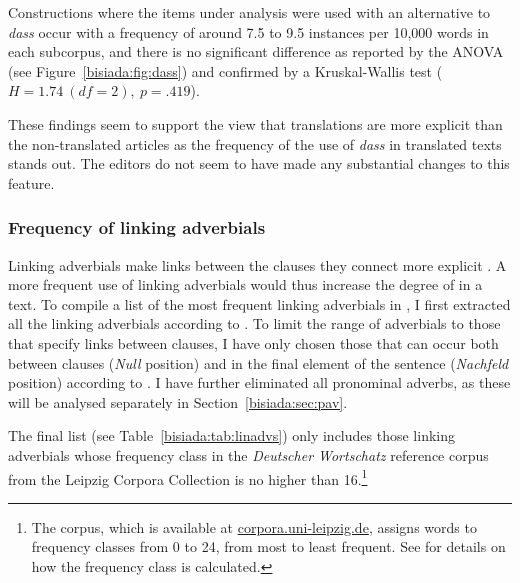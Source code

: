 \documentclass[output=paper]{LSP/langsci}
\begin{document}
Constructions where the items under analysis were used with an alternative to \emph{dass} occur with a frequency of around 7.5 to 9.5 instances per 10,000 words in each subcorpus, and there is no significant difference as reported by the ANOVA (see Figure~\ref{bisiada:fig:dass}) and confirmed by a Kruskal-Wallis test ($H=1.74~(df=2),~p=.419$).

These findings seem to support the view that translations are more explicit than the non-translated articles as the frequency of the use of \emph{dass} in translated texts stands out. The editors do not seem to have made any substantial changes to this feature.

\subsubsection{Frequency of linking adverbials}\label{bisiada:sec:linadv}

Linking adverbials make links between the clauses they connect more explicit \parencite{house15}. A more frequent use of linking adverbials would thus increase the degree of  in a text. To compile a list of the most frequent linking adverbials in , I first extracted all the linking adverbials \parencite[\enquote{konnektintegrierbare Konnektoren}, that is, connectors that can be integrated into one of the clauses they connect, see][487]{pasetal03} according to \textcite[504--509]{pasetal03}. To limit the range of adverbials to those that specify links between clauses, I have only chosen those that can occur both between clauses (\emph{Null} position) and in the final element of the sentence (\emph{Nachfeld} position) according to \textcite[504--509]{pasetal03}. I have further eliminated all pronominal adverbs, as these will be analysed separately in Section~\ref{bisiada:sec:pav}.

The final list (see Table~\ref{bisiada:tab:linadvs}) only includes those linking adverbials whose frequency class in the \emph{Deutscher Wortschatz} reference corpus \parencite{quaetal13} from the Leipzig Corpora Collection is no higher than 16.\footnote{The corpus, which is available at \url{corpora.uni-leipzig.de}, assigns words to frequency classes from 0 to 24, from most to least frequent. See \textcite[2]{quaetal13} for details on how the frequency class is calculated.}
\end{document}
